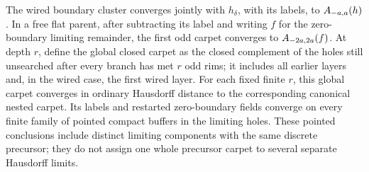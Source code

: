 \begin{proposition}
\label{prop:stopped-tvs}
The wired boundary cluster converges jointly with \(h_\delta\), with its
labels, to \(A_{-a,a}(h)\). In a free flat parent, after subtracting
its label and writing \(f\) for the zero-boundary limiting remainder,
the first odd carpet converges to \(A_{-2a,2a}(f)\). At depth \(r\),
define the global closed carpet as the closed complement of the holes
still unsearched after every branch has met \(r\) odd rims; it includes
all earlier layers and, in the wired case, the first wired layer. For each fixed
finite \(r\), this global carpet converges in ordinary Hausdorff distance
to the corresponding canonical nested carpet. Its labels and restarted
zero-boundary fields converge on every finite family of pointed compact
buffers in the limiting holes. These pointed conclusions include distinct
limiting components with the same discrete precursor; they do not assign
one whole precursor carpet to several separate Hausdorff limits.
\end{proposition}

